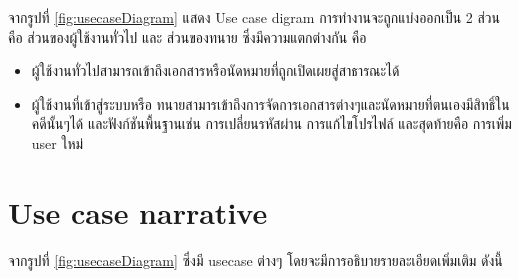 \documentclass[12pt,oneside,openright,a4paper]{cpe-thai-project}
\begin{document}
จากรูปที่ \ref{fig:usecaseDiagram} แสดง Use case digram การทำงานจะถูกแบ่งออกเป็น 2 ส่วน คือ ส่วนของผู้ใช้งานทั่วไป และ ส่วนของทนาย ซึ่งมีความแตกต่างกัน คือ 
\begin{itemize}
    \item ผู้ใช้งานทั่วไปสามารถเข้าถึงเอกสารหรือนัดหมายที่ถูกเปิดเผยสู่สาธารณะได้ 
    \item ผู้ใช้งานที่เข้าสู่ระบบหรือ ทนายสามารเข้าถึงการจัดการเอกสารต่างๆและนัดหมายที่ตนเองมีสิทธิ์ในคดีนั้นๆได้ และฟังก์ชันพื้นฐานเช่น การเปลี่ยนรหัสผ่าน การแก้ไขโปรไฟล์ และสุดท้ายคือ การเพิ่ม user ใหม่ 
\end{itemize}


\clearpage
\section{Use case narrative}
จากรูปที่ \ref{fig:usecaseDiagram} ซึ่งมี usecase ต่างๆ โดยจะมีการอธิบายรายละเอียดเพิ่มเติม ดังนี้
\end{document}
